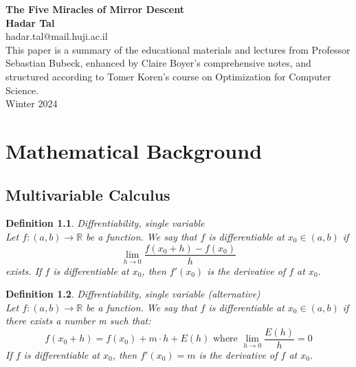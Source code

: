 \documentclass[11pt]{book} %
\newtheorem{definition}{Definition}[section]
\begin{document}
\begin{titlepage}
    \begin{center}
     {\huge\bfseries The Five Miracles of Mirror Descent \\}
     \vspace{1.5cm}
     {\Large\bfseries Hadar Tal}\\[5pt]
     hadar.tal@mail.huji.ac.il\\[14pt]
     \vspace{2cm}
     {This paper is a summary of the educational materials and lectures from Professor Sebastian Bubeck, enhanced by Claire Boyer's comprehensive notes, and structured according to Tomer Koren's course on Optimization for Computer Science.} \\[2cm]

     \vfill
    {Winter 2024}
    \end{center}
\end{titlepage}


\frontmatter
\tableofcontents

\mainmatter
\chapter{Mathematical Background}

\section{Multivariable Calculus}
\begin{definition}{Diffrentiability, single variable} \\
Let $f: (a,b) \rightarrow \mathbb{R}$ be a function. We say that $f$ is differentiable at $x_0 \in (a,b)$ if
\begin{equation}
    \lim_{h \rightarrow 0} \frac{f(x_0 + h) - f(x_0)}{h}
\end{equation}
exists. If $f$ is differentiable at $x_0$, then $f'(x_0)$ is the derivative of $f$ at $x_0$.
\end{definition} 

\bigbreak

\begin{definition}{Diffrentiability, single variable (alternative)} \\
Let $f: (a,b) \rightarrow \mathbb{R}$ be a function. We say that $f$ is differentiable at $x_0 \in (a,b)$ if there exists a number m such that:
\begin{equation}
    f(x_0 + h) = f(x_0) + m \cdot h + E(h) \text{ where } \lim_{h \rightarrow 0} \frac{E(h)}{h} = 0
\end{equation}
If $f$ is differentiable at $x_0$, then $f'(x_0) = m$ is the derivative of $f$ at $x_0$.
\end{definition}
\end{document}

